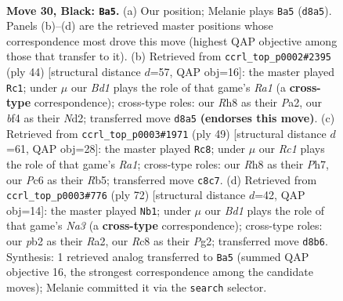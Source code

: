 \documentclass[11pt]{article}
\begin{document}
\clearpage

\begin{figure}[p]\centering
\begin{subfigure}{0.46\textwidth}\centering
\resizebox{\linewidth}{!}{%
\newchessgame
\chessboard[
  setfen={2rb2nr/p4k1p/2p5/8/5B2/3B3P/PPP2KP1/RR6 b - - 0 30},
  showmover=false,
  pgfstyle=straightmove, color=movearrow, markmove={d8-a5}
]}
\caption{}
\end{subfigure}\hfill
\begin{subfigure}{0.46\textwidth}\centering
\resizebox{\linewidth}{!}{%
\newchessgame
\chessboard[
  setfen={2k2r2/pp1r4/2pb4/4p2p/8/8/PP1NRPPP/R5K1 w - - 2 23},
  showmover=false,
  pgfstyle=straightmove, color=movearrow, markmove={a1-c1}
]}
\caption{}
\end{subfigure}
\\[4pt]
\begin{subfigure}{0.46\textwidth}\centering
\resizebox{\linewidth}{!}{%
\newchessgame
\chessboard[
  setfen={r5k1/p2b1ppp/8/1r1p4/3B3P/P2R4/2P2PP1/2K4R b - - 2 25},
  showmover=false,
  pgfstyle=straightmove, color=movearrow, markmove={a8-c8}
]}
\caption{}
\end{subfigure}\hfill
\begin{subfigure}{0.46\textwidth}\centering
\resizebox{\linewidth}{!}{%
\newchessgame
\chessboard[
  setfen={1rr3k1/7p/6p1/P3p3/3bp3/N6P/R4PP1/5R1K w - - 0 37},
  showmover=false,
  pgfstyle=straightmove, color=movearrow, markmove={a3-b1}
]}
\caption{}
\end{subfigure}
\caption{\textbf{Move 30, Black: \texttt{Ba5}.} (a) Our position; Melanie plays \texttt{Ba5} (\texttt{d8a5}). Panels (b)--(d) are the retrieved master positions whose correspondence most drove this move (highest QAP objective among those that transfer to it). (b) Retrieved from \texttt{ccrl\_top\_p0002\#2395} (ply 44) [structural distance $d$=57, QAP obj=16]: the master played \texttt{Rc1}; under $\mu$ our \emph{Bd1} plays the role of that game's \emph{Ra1} (a \textbf{cross-type} correspondence); cross-type roles: our \emph{R}h8 as their \emph{P}a2, our \emph{b}f4 as their \emph{N}d2; transferred move \texttt{d8a5} \textbf{(endorses this move)}. (c) Retrieved from \texttt{ccrl\_top\_p0003\#1971} (ply 49) [structural distance $d$=61, QAP obj=28]: the master played \texttt{Rc8}; under $\mu$ our \emph{Rc1} plays the role of that game's \emph{Ra1}; cross-type roles: our \emph{R}h8 as their \emph{P}h7, our \emph{P}c6 as their \emph{R}b5; transferred move \texttt{c8c7}. (d) Retrieved from \texttt{ccrl\_top\_p0003\#776} (ply 72) [structural distance $d$=42, QAP obj=14]: the master played \texttt{Nb1}; under $\mu$ our \emph{Bd1} plays the role of that game's \emph{Na3} (a \textbf{cross-type} correspondence); cross-type roles: our \emph{p}b2 as their \emph{R}a2, our \emph{R}c8 as their \emph{P}g2; transferred move \texttt{d8b6}. Synthesis: 1 retrieved analog transferred to \texttt{Ba5} (summed QAP objective 16, the strongest correspondence among the candidate moves); Melanie committed it via the \texttt{search} selector.}
\label{fig:thought-m59}
\end{figure}
\end{document}
